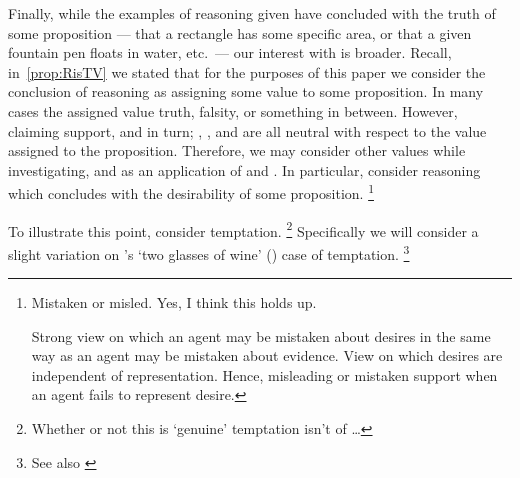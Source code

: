 \begin{note}[Desire]
  Finally, while the examples of reasoning given have concluded with the truth of some proposition --- that a rectangle has some specific area, or that a given fountain pen floats in water, etc.\ --- our interest with \EAS{} is broader.
  Recall, in~\autoref{prop:RisTV} we stated that for the purposes of this paper we consider the conclusion of reasoning as assigning some value to some proposition.
  In many cases the assigned value truth, falsity, or something in between.
  However, claiming support, and in turn; \USE{}, \ESU{}, and \EAS{} are all neutral with respect to the value assigned to the proposition.
  Therefore, we may consider other values while investigating, and as an application of \ESU{} and \EAS{}.
  In particular, consider reasoning which concludes with the desirability of some proposition.\nolinebreak
  \footnote{
    \color{red}
    Mistaken or misled.
    Yes, I think this holds up.

    Strong view on which an agent may be mistaken about desires in the same way as an agent may be mistaken about evidence.
    View on which desires are independent of representation.
    Hence, misleading or mistaken support when an agent fails to represent desire.
  }

  To illustrate this point, consider temptation.\nolinebreak
  \footnote{
    \color{red}
    Whether or not this is `genuine' temptation isn't of \dots
  }
  Specifically we will consider a slight variation on \citeauthor{Bratman:1999ac}'s `two glasses of wine' (\Citeyear[38]{Bratman:1999ac}) case of temptation.\nolinebreak
  \footnote{
    \color{red}
    See also \textcite{Bratman:2007ab}
  }
\end{note}

